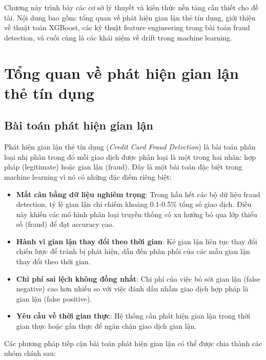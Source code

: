 Chương này trình bày các cơ sở lý thuyết và kiến thức nền tảng cần thiết cho đề tài. Nội dung bao gồm: tổng quan về phát hiện gian lận thẻ tín dụng, giới thiệu về thuật toán XGBoost, các kỹ thuật feature engineering trong bài toán fraud detection, và cuối cùng là các khái niệm về drift trong machine learning.

\section{Tổng quan về phát hiện gian lận thẻ tín dụng}

\subsection{Bài toán phát hiện gian lận}

Phát hiện gian lận thẻ tín dụng (\textit{Credit Card Fraud Detection}) là bài toán phân loại nhị phân trong đó mỗi giao dịch được phân loại là một trong hai nhãn: hợp pháp (legitimate) hoặc gian lận (fraud). Đây là một bài toán đặc biệt trong machine learning vì nó có những đặc điểm riêng biệt:

\begin{itemize}
    \item \textbf{Mất cân bằng dữ liệu nghiêm trọng}: Trong hầu hết các bộ dữ liệu fraud detection, tỷ lệ gian lận chỉ chiếm khoảng 0.1-0.5\% tổng số giao dịch. Điều này khiến các mô hình phân loại truyền thống có xu hướng bỏ qua lớp thiểu số (fraud) để đạt accuracy cao.
    
    \item \textbf{Hành vi gian lận thay đổi theo thời gian}: Kẻ gian lận liên tục thay đổi chiến lược để tránh bị phát hiện, dẫn đến phân phối của các mẫu gian lận thay đổi theo thời gian.
    
    \item \textbf{Chi phí sai lệch không đồng nhất}: Chi phí của việc bỏ sót gian lận (false negative) cao hơn nhiều so với việc đánh dấu nhầm giao dịch hợp pháp là gian lận (false positive).
    
    \item \textbf{Yêu cầu về thời gian thực}: Hệ thống cần phát hiện gian lận trong thời gian thực hoặc gần thực để ngăn chặn giao dịch gian lận.
\end{itemize}

Các phương pháp tiếp cận bài toán phát hiện gian lận có thể được chia thành các nhóm chính sau:

